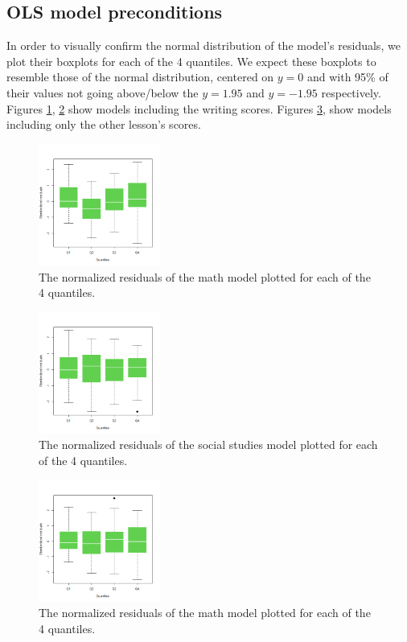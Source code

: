 \documentclass[10pt]{article}
\begin{document}
	
	\subsection{OLS model preconditions}
	
	In order to visually confirm the normal distribution of the model's residuals, we plot their boxplots for each of the 4 quantiles. We expect these boxplots to resemble those of the normal distribution, centered on $y=0$ and with 95\% of their values not going above/below the $y=1.95$ and $y=-1.95$ respectively. Figures \ref{fig::lm_math_boxplot}, \ref{fig::lm_socst_boxplot} show models including the writing scores. Figures \ref{fig::lm_math_nopeeking_boxplot},  show models including only the other lesson's scores.
	
	\begin{figure}
		\includegraphics[width=4cm]{lm_math_residual_boxplot.png}
		\centering
		\caption{The normalized residuals of the math model plotted for each of the 4 quantiles.}
		\label{fig::lm_math_boxplot}
	\end{figure}

	\begin{figure}
		\includegraphics[width=4cm]{lm_socst_residual_boxplot.png}
		\centering
		\caption{The normalized residuals of the social studies model plotted for each of the 4 quantiles. }
		\label{fig::lm_socst_boxplot}
	\end{figure}

	\begin{figure}
		\includegraphics[width=4cm]{lm_math_nopeeking_residual_boxplot.png}
		\centering
		\caption{The normalized residuals of the math model plotted for each of the 4 quantiles. }
		\label{fig::lm_math_nopeeking_boxplot}
	\end{figure}
	
\end{document}
